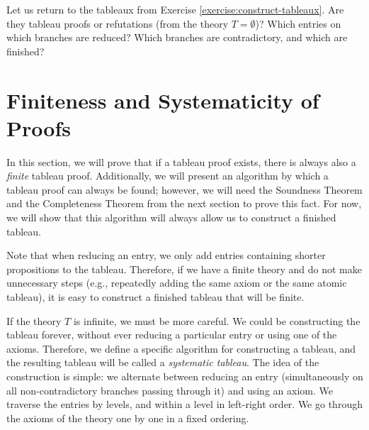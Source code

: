 \begin{exercise}
    Let us return to the tableaux from Exercise \ref{exercise:construct-tableaux}. Are they tableau proofs or refutations (from the theory $T = \emptyset$)? Which entries on which branches are reduced? Which branches are contradictory, and which are finished?
\end{exercise}


\section{Finiteness and Systematicity of Proofs}\label{section:finiteness-and-systematicity-of-proofs}

In this section, we will prove that if a tableau proof exists, there is always also a \emph{finite} tableau proof. Additionally, we will present an algorithm by which a tableau proof can always be found; however, we will need the Soundness Theorem and the Completeness Theorem from the next section to prove this fact. For now, we will show that this algorithm will always allow us to construct a finished tableau.

Note that when reducing an entry, we only add entries containing shorter propositions to the tableau. Therefore, if we have a finite theory and do not make unnecessary steps (e.g., repeatedly adding the same axiom or the same atomic tableau), it is easy to construct a finished tableau that will be finite.

If the theory $T$ is infinite, we must be more careful. We could be constructing the tableau forever, without ever reducing a particular entry or using one of the axioms. Therefore, we define a specific algorithm for constructing a tableau, and the resulting tableau will be called a \emph{systematic tableau}. The idea of the construction is simple: we alternate between reducing an entry (simultaneously on all non-contradictory branches passing through it) and using an axiom. We traverse the entries by levels, and within a level in left-right order. We go through the axioms of the theory one by one in a fixed ordering.


